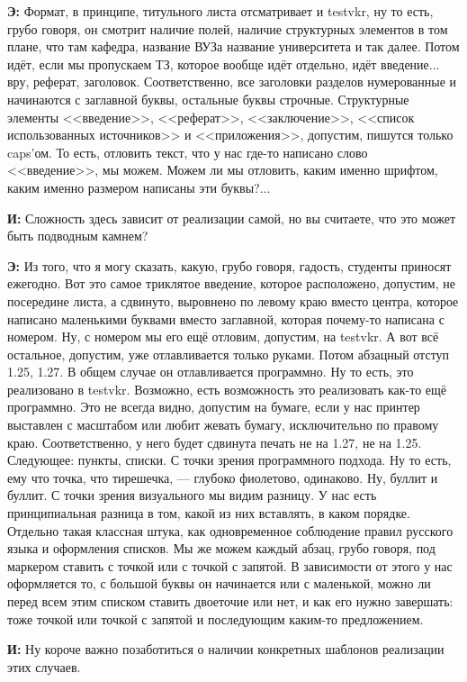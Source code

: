 \textbf{Э: }Формат, в принципе, титульного листа отсматривает и testvkr, ну то есть, грубо говоря, он смотрит наличие полей, наличие структурных элементов в том плане, что там кафедра, название ВУЗа название университета и так далее. Потом идёт, если мы пропускаем ТЗ, которое вообще идёт отдельно, идёт введение... вру, реферат, заголовок. Соответственно, все заголовки разделов нумерованные и начинаются с заглавной буквы, остальные буквы строчные. Структурные элементы <<введение>>, <<реферат>>, <<заключение>>, <<список использованных источников>> и <<приложения>>, допустим, пишутся только caps'ом. То есть, отловить текст, что у нас где-то написано слово <<введение>>, мы можем. Можем ли мы отловить, каким именно шрифтом, каким именно размером написаны эти буквы?...

\textbf{И: }Сложность здесь зависит от реализации самой, но вы считаете, что это может быть подводным камнем?

\textbf{Э: }Из того, что я могу сказать, какую, грубо говоря, гадость, студенты приносят ежегодно. Вот это самое триклятое введение, которое расположено, допустим, не посередине листа, а сдвинуто, выровнено по левому краю вместо центра, которое написано маленькими буквами вместо заглавной, которая почему-то написана с номером. Ну, с номером мы его ещё отловим, допустим, на testvkr. А вот всё остальное, допустим, уже отлавливается только руками. Потом абзацный отступ 1.25, 1.27. В общем случае он отлавливается программно. Ну то есть, это реализовано в testvkr. Возможно, есть возможность это реализовать как-то ещё программно. Это не всегда видно, допустим на бумаге, если у нас принтер выставлен с масштабом или любит жевать бумагу, исключительно по правому краю. Соответственно, у него будет сдвинута печать не на 1.27, не на 1.25. Следующее: пункты, списки. С точки зрения программного подхода. Ну то есть, ему что точка, что тирешечка, --- глубоко фиолетово, одинаково. Ну, буллит и буллит. С точки зрения визуального мы видим разницу. У нас есть принципиальная разница в том, какой из них вставлять, в каком порядке. Отдельно такая классная штука, как одновременное соблюдение правил русского языка и оформления списков. Мы же можем каждый абзац, грубо говоря, под маркером ставить с точкой или с точкой с запятой. В зависимости от этого у нас оформляется то, с большой буквы он начинается или с маленькой, можно ли перед всем этим списком ставить двоеточие или нет, и как его нужно завершать: тоже точкой или точкой с запятой и последующим каким-то предложением.

\textbf{И: }Ну короче важно позаботиться о наличии конкретных шаблонов реализации этих случаев. 

